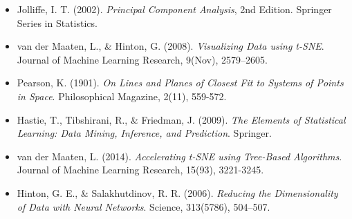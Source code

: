 \documentclass{article}
\begin{document}
\begin{itemize}
    \item Jolliffe, I. T. (2002). \textit{Principal Component Analysis}, 2nd Edition. Springer Series in Statistics.
    
    \item van der Maaten, L., \& Hinton, G. (2008). \textit{Visualizing Data using t-SNE}. Journal of Machine Learning Research, 9(Nov), 2579–2605.
    
    \item Pearson, K. (1901). \textit{On Lines and Planes of Closest Fit to Systems of Points in Space}. Philosophical Magazine, 2(11), 559-572.
    
    \item Hastie, T., Tibshirani, R., \& Friedman, J. (2009). \textit{The Elements of Statistical Learning: Data Mining, Inference, and Prediction}. Springer.
    
    \item van der Maaten, L. (2014). \textit{Accelerating t-SNE using Tree-Based Algorithms}. Journal of Machine Learning Research, 15(93), 3221-3245.
    
    \item Hinton, G. E., \& Salakhutdinov, R. R. (2006). \textit{Reducing the Dimensionality of Data with Neural Networks}. Science, 313(5786), 504–507.
\end{itemize}
\end{document}
